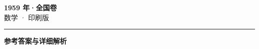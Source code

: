 \documentclass[zihao=5, a4paper]{ctexart}
\begin{document}
\begin{center}
  {\Large\bfseries 1959 年·全国卷}\\[4pt]
  {\large 数学 · 印刷版}
\end{center}
\medskip
{}

\par\bigskip\hrule\bigskip
{}
\begin{center}{\large\bfseries 参考答案与详细解析}\end{center}
\smallskip

\end{document}
